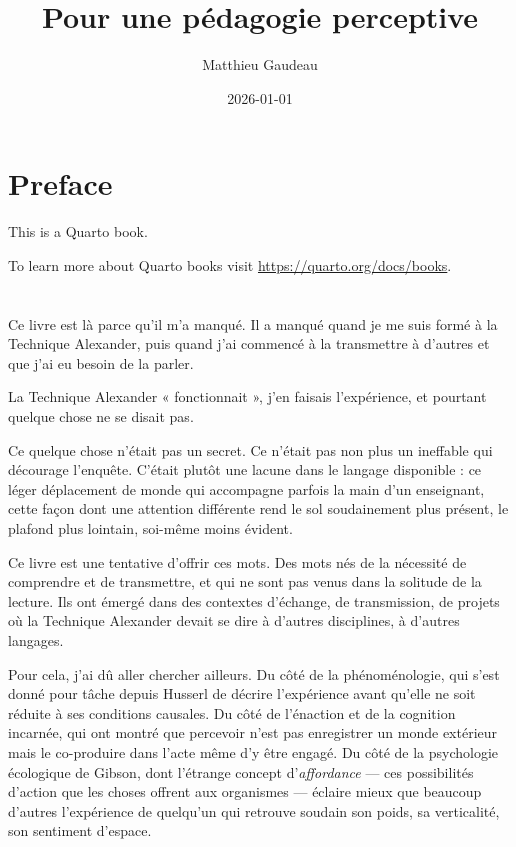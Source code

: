 \documentclass[
  french,
  letterpaper,
  DIV=11,
  numbers=noendperiod]{scrreprt}
\title{Pour une pédagogie perceptive}
\author{Matthieu Gaudeau}
\date{2026-01-01}
\renewcommand*\contentsname{Table des matières}
\newcommand\contentsname{Table des matières}
\begin{document}
\maketitle

\renewcommand*\contentsname{Table des matières}
{
\setcounter{tocdepth}{2}
\tableofcontents
}


\chapter*{Preface}\label{preface}


This is a Quarto book.

To learn more about Quarto books visit
\url{https://quarto.org/docs/books}.


\chapter{}\label{section}

Ce livre est là parce qu'il m'a manqué. Il a manqué quand je me suis
formé à la Technique Alexander, puis quand j'ai commencé à la
transmettre à d'autres et que j'ai eu besoin de la parler.~

La Technique Alexander « fonctionnait », j'en faisais l'expérience, et
pourtant quelque chose ne se disait pas.

Ce quelque chose n'était pas un secret. Ce n'était pas non plus un
ineffable qui décourage l'enquête. C'était plutôt une lacune dans le
langage disponible : ce léger déplacement de monde qui accompagne
parfois la main d'un enseignant, cette façon dont une attention
différente rend le sol soudainement plus présent, le plafond plus
lointain, soi-même moins évident.

Ce livre est une tentative d'offrir ces mots. Des mots nés de la
nécessité de comprendre et de transmettre, et qui ne sont pas venus dans
la solitude de la lecture. Ils ont émergé dans des contextes d'échange,
de transmission, de projets où la Technique Alexander devait se dire à
d'autres disciplines, à d'autres langages.

Pour cela, j'ai dû aller chercher ailleurs. Du côté de la
phénoménologie, qui s'est donné pour tâche depuis Husserl de décrire
l'expérience avant qu'elle ne soit réduite à ses conditions causales. Du
côté de l'énaction et de la cognition incarnée, qui ont montré que
percevoir n'est pas enregistrer un monde extérieur mais le co-produire
dans l'acte même d'y être engagé. Du côté de la psychologie écologique
de Gibson, dont l'étrange concept d'\emph{affordance} --- ces
possibilités d'action que les choses offrent aux organismes --- éclaire
mieux que beaucoup d'autres l'expérience de quelqu'un qui retrouve
soudain son poids, sa verticalité, son sentiment d'espace.
\end{document}
